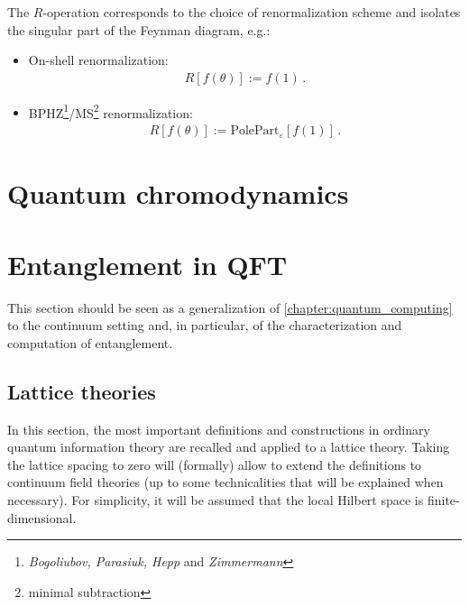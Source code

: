     The $R$-operation corresponds to the choice of renormalization scheme and isolates the singular part of the Feynman diagram, e.g.:
    \begin{itemize}
        \item On-shell renormalization:
        \begin{gather}
            R[f(\theta)] := f(1)\,.
        \end{gather}
        \item BPHZ\footnote{\textit{Bogoliubov, Parasiuk, Hepp} and \textit{Zimmermann}}/MS\footnote{minimal subtraction} renormalization:
        \begin{gather}
            R[f(\theta)] := \mathrm{PolePart}_\varepsilon[f(1)]\,.
        \end{gather}
    \end{itemize}


\section{Quantum chromodynamics}


\section{Entanglement in QFT}

    This section should be seen as a generalization of \cref{chapter:quantum_computing} to the continuum setting and, in particular, of the characterization and computation of entanglement.

\subsection{Lattice theories}

    In this section, the most important definitions and constructions in ordinary quantum information theory are recalled and applied to a lattice theory. Taking the lattice spacing to zero will (formally) allow to extend the definitions to continuum field theories (up to some technicalities that will be explained when necessary). For simplicity, it will be assumed that the local Hilbert space is finite-dimensional.

